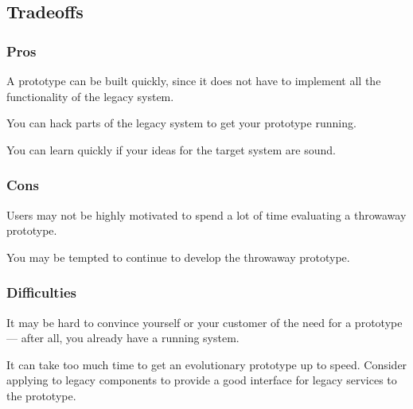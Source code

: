 \documentclass[a4paper,10pt,twoside]{book}
\begin{document}
\subsection*{Tradeoffs}

\subsubsection*{Pros}

\begin{bulletlist}
\item A prototype can be built quickly, since it does not have to implement all the functionality of the legacy system.

\item You can hack parts of the legacy system to get your prototype running.

\item You can learn quickly if your ideas for the target system are sound.
\end{bulletlist}

\subsubsection*{Cons}

\begin{bulletlist}
\item Users may not be highly motivated to spend a lot of time evaluating a throwaway prototype.

\item You may be tempted to continue to develop the throwaway prototype.
\end{bulletlist}

\subsubsection*{Difficulties}

\begin{bulletlist}
\item It may be hard to convince yourself or your customer of the need for a prototype --- after all, you already have a running system.

\item It can take too much time to get an evolutionary prototype up to speed. Consider applying  to legacy components to provide a good interface for legacy services to the prototype. 
\end{bulletlist}
\end{document}
